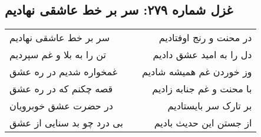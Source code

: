 \begin{center}
\section*{غزل شماره ۲۷۹: سر بر خط عاشقی نهادیم}
\label{sec:279}
\begin{longtable}{l p{0.5cm} r}
سر بر خط عاشقی نهادیم
&&
در محنت و رنج اوفتادیم
\\
تن را به بلا و غم سپردیم
&&
دل را به امید عشق دادیم
\\
غمخواره شدیم در ره عشق
&&
وز خوردن غم همیشه شادیم
\\
قصه چکنم که در ره عشق
&&
با محنت و غم جنابه زادیم
\\
در حضرت عشق خوبرویان
&&
بر تارک سر بایستادیم
\\
بی درد چو بد سنایی از عشق
&&
از جستن این حدیث بادیم
\\
\end{longtable}
\end{center}
